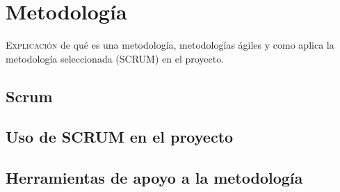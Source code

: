 
\chapter{Metodología}
\label{chap:metodologia}

\lettrine{E}{xplicación} de qué es una metodología, metodologías ágiles y como aplica la metodología seleccionada (SCRUM) en el proyecto.


\section{Scrum}


\section{Uso de SCRUM en el proyecto}

\section{Herramientas de apoyo a la metodología}
